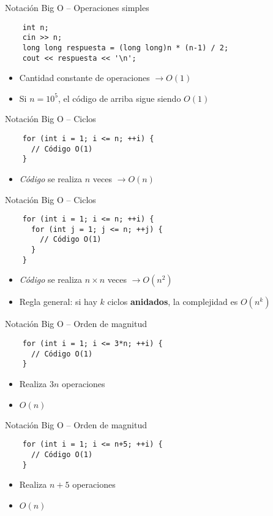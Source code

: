 \documentclass[10pt]{beamer}
\newcommand{\bi}{\begin{itemize}}
\newcommand{\ei}{\end{itemize}}
\begin{document}
\begin{frame}[fragile]{Notación Big O -- Operaciones simples}
  \begin{verbatim}
    int n;
    cin >> n;
    long long respuesta = (long long)n * (n-1) / 2;
    cout << respuesta << '\n';
  \end{verbatim}
  \bi
    \item Cantidad constante de operaciones $\rightarrow O(1)$
    \item Si $n = 10^5$, el código de arriba sigue siendo $O(1)$
  \ei
\end{frame}

\begin{frame}[fragile]{Notación Big O -- Ciclos}
  \begin{verbatim}
    for (int i = 1; i <= n; ++i) {
      // Código O(1)
    }
  \end{verbatim}
  \bi
    \item \textit{Código} se realiza $n$ veces $\rightarrow O(n)$
  \ei
\end{frame}

\begin{frame}[fragile]{Notación Big O -- Ciclos}
  \begin{verbatim}
    for (int i = 1; i <= n; ++i) {
      for (int j = 1; j <= n; ++j) {
        // Código O(1)
      }
    }
  \end{verbatim}
  \bi
    \item \textit{Código} se realiza $n \times n$ veces $\rightarrow O(n^2)$
    \item <2-> Regla general: si hay $k$ ciclos \textbf{anidados}, la complejidad es $O(n^k)$
  \ei
\end{frame}

\begin{frame}[fragile]{Notación Big O -- Orden de magnitud}
  \begin{verbatim}
    for (int i = 1; i <= 3*n; ++i) {
      // Código O(1)
    }
  \end{verbatim}
  \bi
    \item Realiza $3n$ operaciones
    \item <2-> $O(n)$
  \ei
\end{frame}

\begin{frame}[fragile]{Notación Big O -- Orden de magnitud}
  \begin{verbatim}
    for (int i = 1; i <= n+5; ++i) {
      // Código O(1)
    }
  \end{verbatim}
  \bi
    \item Realiza $n+5$ operaciones
    \item <2-> $O(n)$
  \ei
\end{frame}
\end{document}
